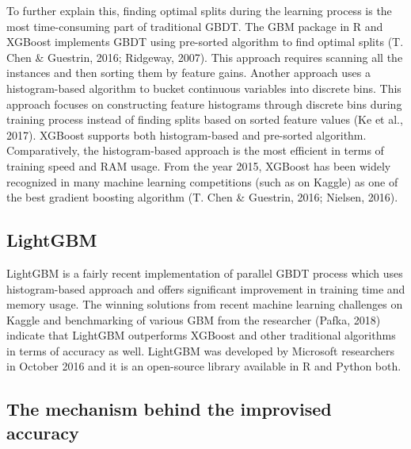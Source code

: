 \documentclass[11pt,oneside,a4paper]{reedthesis}
\begin{document}
To further explain this, finding optimal splits during the learning
process is the most time-consuming part of traditional GBDT. The GBM
package in R and XGBoost implements GBDT using pre-sorted algorithm to
find optimal splits (T. Chen \& Guestrin, 2016; Ridgeway, 2007). This
approach requires scanning all the instances and then sorting them by
feature gains. Another approach uses a histogram-based algorithm to
bucket continuous variables into discrete bins. This approach focuses on
constructing feature histograms through discrete bins during training
process instead of finding splits based on sorted feature values (Ke et
al., 2017). XGBoost supports both histogram-based and pre-sorted
algorithm. Comparatively, the histogram-based approach is the most
efficient in terms of training speed and RAM usage. From the year 2015,
XGBoost has been widely recognized in many machine learning competitions
(such as on Kaggle) as one of the best gradient boosting algorithm (T.
Chen \& Guestrin, 2016; Nielsen, 2016).

\subsection{LightGBM}\label{lightgbm}

LightGBM is a fairly recent implementation of parallel GBDT process
which uses histogram-based approach and offers significant improvement
in training time and memory usage. The winning solutions from recent
machine learning challenges on Kaggle and benchmarking of various GBM
from the researcher (Pafka, 2018) indicate that LightGBM outperforms
XGBoost and other traditional algorithms in terms of accuracy as well.
LightGBM was developed by Microsoft researchers in October 2016 and it
is an open-source library available in R and Python both.

\subsection{The mechanism behind the improvised
accuracy}\label{the-mechanism-behind-the-improvised-accuracy}
\end{document}
